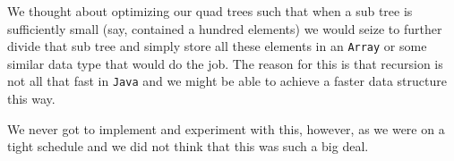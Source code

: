 We thought about optimizing our quad trees such that when a sub tree is sufficiently small (say, contained a hundred elements) we would seize to further divide that sub tree and simply store all these elements in an \texttt{Array} or some similar data type that would do the job. The reason for this is that recursion is not all that fast in \texttt{Java} and we might be able to achieve a faster data structure this way.

We never got to implement and experiment with this, however, as we were on a tight schedule and we did not think that this was such a big deal.